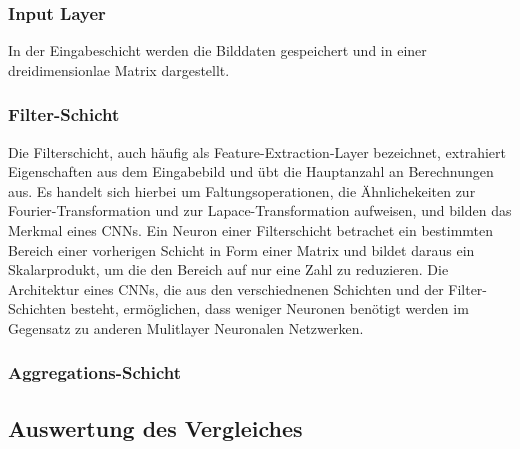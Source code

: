 \subsubsection{Input Layer}
In der Eingabeschicht werden die Bilddaten gespeichert und in einer dreidimensionlae Matrix dargestellt.

\subsubsection{Filter-Schicht}
Die Filterschicht, auch häufig als Feature-Extraction-Layer bezeichnet, extrahiert Eigenschaften aus dem Eingabebild und übt die Hauptanzahl an Berechnungen aus. 
Es handelt sich hierbei um Faltungsoperationen, die Ähnlichekeiten zur Fourier-Transformation und zur Lapace-Transformation aufweisen, und bilden das Merkmal eines CNNs.
Ein Neuron einer Filterschicht betrachet ein bestimmten Bereich einer vorherigen Schicht in Form einer Matrix und bildet daraus ein Skalarprodukt, um die den Bereich auf nur eine Zahl zu reduzieren.
Die Architektur eines CNNs, die aus den verschiednenen Schichten und der Filter-Schichten besteht, ermöglichen, dass weniger Neuronen benötigt werden im Gegensatz zu anderen Mulitlayer Neuronalen Netzwerken.

\subsubsection{Aggregations-Schicht}


\subsection{Auswertung des Vergleiches}
